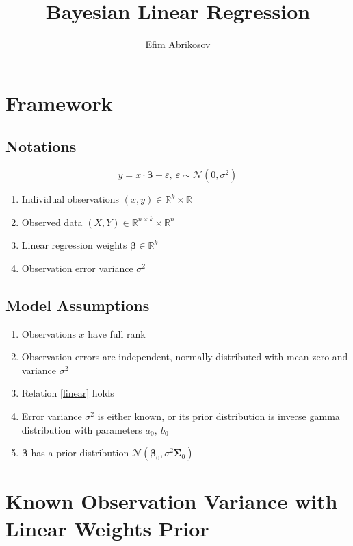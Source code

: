 \documentclass[12pt]{article}
\theoremstyle{definition}
\theoremstyle{remark}
\numberwithin{equation}{section}
\newcommand{\RR}{\mathbb{R}}
\newcommand{\bbeta}{\boldsymbol{\beta}}
\newcommand{\SSigma}{\boldsymbol{\Sigma}}
\begin{document}
\title{Bayesian Linear Regression}
\author{Efim Abrikosov}
\maketitle

\section{Framework}
\subsection{Notations}

\begin{equation}\label{linear}
    y = x\cdot \bbeta +\varepsilon,\ \varepsilon \sim\mathcal{N}(0,\sigma^2)
\end{equation}

\begin{enumerate}
    \item Individual observations $(x, y) \in \RR^k\times \RR$
    \item Observed data $(X, Y)\in \RR^{n\times k}\times \RR^n$
    \item Linear regression weights $\bbeta \in \RR^k$ 
    \item Observation error variance $\sigma^2$
\end{enumerate}

\subsection{Model Assumptions}
\begin{enumerate}
    \item Observations $x$ have full rank
    \item Observation errors are independent, normally distributed with mean zero and variance $\sigma^2$
    \item Relation \ref{linear} holds
    \item Error variance $\sigma^2$ is either known, or its prior distribution is inverse gamma distribution with parameters $a_0,\ b_0$
    \item $\bbeta$ has a prior distribution $\mathcal{N}(\bbeta_0,\sigma^2\SSigma_0)$
\end{enumerate}

\section{Known Observation Variance with Linear Weights Prior}
\end{document}
